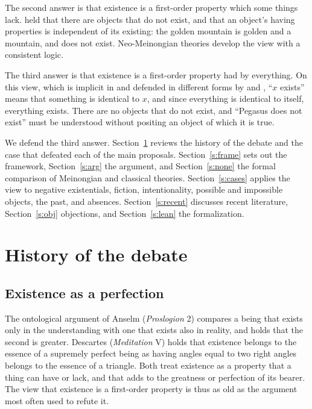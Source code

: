 \documentclass{situationist-preprint}
\begin{document}
The second answer is that existence is a first-order property which some things lack. \citet{Meinong1904} held that there are objects that do not exist, and that an object's having properties is independent of its existing: the golden mountain is golden and a mountain, and does not exist. Neo-Meinongian theories \citep{Parsons1980,Routley1980,Priest2005,Berto2013} develop the view with a consistent logic.

The third answer is that existence is a first-order property had by everything. On this view, which is implicit in \citet{Quine1948} and defended in different forms by \citet{Salmon1987} and \citet{Williamson2013}, \enquote{$x$ exists} means that something is identical to $x$, and since everything is identical to itself, everything exists. There are no objects that do not exist, and \enquote{Pegasus does not exist} must be understood without positing an object of which it is true.

We defend the third answer. Section~\ref{s:history} reviews the history of the debate and the case that defeated each of the main proposals. Section~\ref{s:frame} sets out the framework, Section~\ref{s:arg} the argument, and Section~\ref{s:none} the formal comparison of Meinongian and classical theories. Section~\ref{s:cases} applies the view to negative existentials, fiction, intentionality, possible and impossible objects, the past, and absences. Section~\ref{s:recent} discusses recent literature, Section~\ref{s:obj} objections, and Section~\ref{s:lean} the formalization.

\section{History of the debate}\label{s:history}

\subsection{Existence as a perfection}

The ontological argument of Anselm (\emph{Proslogion} 2) compares a being that exists only in the understanding with one that exists also in reality, and holds that the second is greater. Descartes (\emph{Meditation} V) holds that existence belongs to the essence of a supremely perfect being as having angles equal to two right angles belongs to the essence of a triangle. Both treat existence as a property that a thing can have or lack, and that adds to the greatness or perfection of its bearer. The view that existence is a first-order property is thus as old as the argument most often used to refute it.
\end{document}
